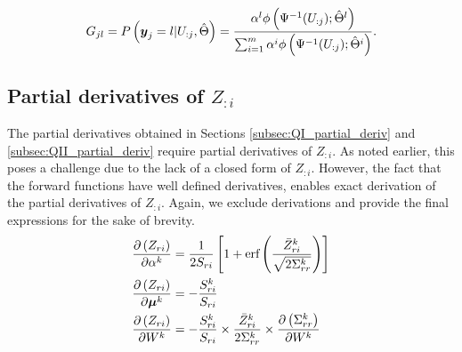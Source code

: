 \documentclass{article}
\begin{document}
\begin{align}
G_{jl}=P\left(\bs{y}_j=l|U_{:j},\hat{\Theta}\right)=\frac{\alpha^l\phi\left(\Psi^{-1}(U_{:j}); \hat{\Theta}^l\right)}{\sum_{i=1}^m\alpha^i\phi\left(\Psi^{-1}(U_{:j}); \hat{\Theta}^i\right)}.
\end{align}






\subsection{Partial derivatives of $Z_{:i}$}
The partial derivatives obtained in Sections \ref{subsec:QI_partial_deriv} and \ref{subsec:QII_partial_deriv} require partial derivatives of $Z_{:i}$. As noted earlier, this poses a challenge due to the lack of a closed form of $Z_{:i}$. However, the fact that the forward functions have well defined derivatives, enables exact derivation of the partial derivatives of $Z_{:i}$. Again, we exclude derivations and provide the final expressions for the sake of brevity.
\begin{align}\label{eq:der_z}
\der{\alpha^k}{Z_{ri}} &= \frac{1}{2S_{ri}}\left[1+ \erf \left( \frac{\bar{Z}^k_{ri}}{\sqrt{2\Sigma_{rr}^k}}\right) \right] \\
\der{\bs{\mu}^k}{Z_{ri}} &= -\frac{S^k_{ri}}{S_{ri}} \\
\der{W^k}{Z_{ri}} &= -\frac{S^k_{ri}}{S_{ri}}  \times \frac{\bar{Z}_{ri}^k}{2\Sigma_{rr}^k} \times \der{W^k}{\Sigma_{rr}^k}
\end{align}

 
 
\end{document}
